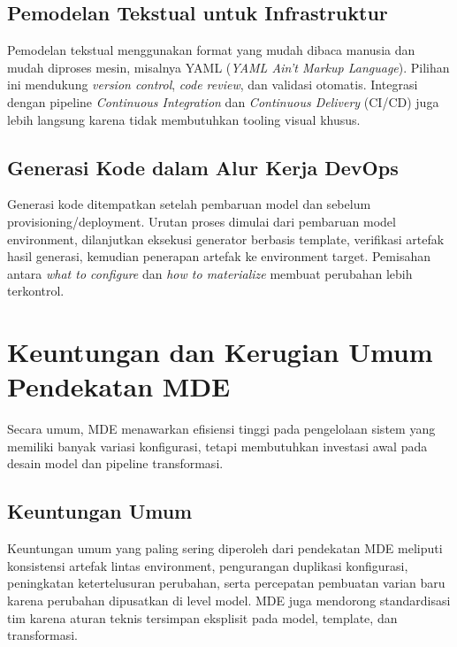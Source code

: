 \subsection[Pemodelan Tekstual untuk Infrastruktursubsec]{Pemodelan Tekstual untuk Infrastruktur}\label{subsec:mde-pemodelan-tekstual}

Pemodelan tekstual menggunakan format yang mudah dibaca manusia dan mudah diproses mesin, misalnya YAML (\textit{YAML Ain't Markup Language}). Pilihan ini mendukung \textit{version control}, \textit{code review}, dan validasi otomatis. Integrasi dengan pipeline \textit{Continuous Integration} dan \textit{Continuous Delivery} (CI/CD) juga lebih langsung karena tidak membutuhkan tooling visual khusus.

\subsection[Generasi Kode dalam Alur Kerja DevOpssubsec]{Generasi Kode dalam Alur Kerja DevOps}\label{subsec:mde-generasi-kode}

Generasi kode ditempatkan setelah pembaruan model dan sebelum provisioning/deployment. Urutan proses dimulai dari pembaruan model environment, dilanjutkan eksekusi generator berbasis template, verifikasi artefak hasil generasi, kemudian penerapan artefak ke environment target. Pemisahan antara \textit{what to configure} dan \textit{how to materialize} membuat perubahan lebih terkontrol.

\section[Keuntungan dan Kerugian Umum Pendekatan]{Keuntungan dan Kerugian Umum Pendekatan MDE}\label{sec:mde-keuntungan-kerugian-umum}

Secara umum, MDE menawarkan efisiensi tinggi pada pengelolaan sistem yang memiliki banyak variasi konfigurasi, tetapi membutuhkan investasi awal pada desain model dan pipeline transformasi.

\subsection{Keuntungan Umum}\label{subsec:mde-keuntungan-umum}

Keuntungan umum yang paling sering diperoleh dari pendekatan MDE meliputi konsistensi artefak lintas environment, pengurangan duplikasi konfigurasi, peningkatan ketertelusuran perubahan, serta percepatan pembuatan varian baru karena perubahan dipusatkan di level model. MDE juga mendorong standardisasi tim karena aturan teknis tersimpan eksplisit pada model, template, dan transformasi.

